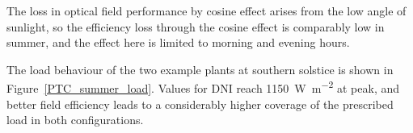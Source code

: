 %

The loss in optical field performance by cosine effect arises from the low angle of sunlight, so the efficiency loss through the cosine effect is comparably low in summer, and the effect here is limited to morning and evening hours. 


The load behaviour of the two example plants at southern solstice is shown in Figure~\ref{PTC_summer_load}. Values for DNI reach \SI{1150}{\watt\per\square\metre} at peak, and better field efficiency leads to a considerably higher coverage of the prescribed load in both configurations. 

